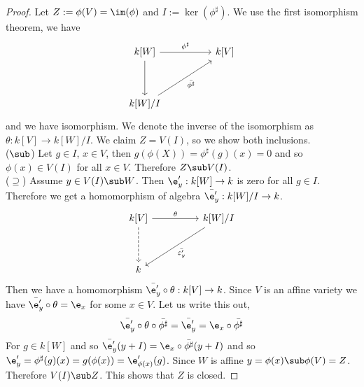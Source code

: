 \begin{proof}
  Let $Z := \phi(V) = \im (\phi)$ and $I := \ker(\phi^\sharp)$. We use the first isomorphism theorem, we have
  \[\begin{tikzcd}
	{k[W]} && {k[V]} \\
	\\
	{k[W]/I}
	\arrow["{\phi^\sharp}", from=1-1, to=1-3]
	\arrow["{\bar{\phi^\sharp}}"', from=3-1, to=1-3]
	\arrow[from=1-1, to=3-1]
\end{tikzcd}\]
and we have isomorphism. We denote the inverse of the isomorphism as $\theta : k[V] \to k[W]/I$. We claim $Z = V(I)$, so we show both inclusions.\\
($\sub$) Let $g \in I$, $x \in V$, then $g(\phi(X)) = \phi^\sharp (g)(x) = 0$ and so $\phi(x) \in V(I)$ for all $x \in V$. Therefore $Z \sub V(I)$.\\
($\supseteq$) Assume $y \in V(I) \sub W$. Then $\e'_y : k[W] \to k$ is zero for all $g \in I$. Therefore we get a homomorphism of algebra $\bar{\e'_y} : k[W]/I \to k$.
\[\begin{tikzcd}
	{k[V]} && {k[W]/I} \\
	\\
	k
	\arrow["\theta", from=1-1, to=1-3]
	\arrow["{\bar{\varepsilon'_y}}", from=1-3, to=3-1]
	\arrow[dashed, from=1-1, to=3-1]
\end{tikzcd}\]
Then we have a homomorphism $\bar{\e'_y} \circ \theta : k[V] \to k$. Since $V$ is an affine variety we have $\bar{\e'_y} \circ \theta = \e_x$ for some $x \in V$. Let us write this out,
$$ \bar{\e'_y} \circ \theta \circ \bar{\phi^\sharp} = \bar{\e'_{y}} = \e_x \circ \bar{\phi^\sharp} $$
For $g \in k[W]$ and so $\bar{\e'_y} (y + I) = \e_x \circ \bar{\phi^\sharp}(y + I)$ and so $\e'_y = \phi^\sharp (g)(x) = g(\phi(x)) = \e'_{\phi(x)}(g)$. Since $W$ is affine $y = \phi(x) \sub \phi(V) = Z$. Therefore $V(I) \sub Z$. This shows that $Z$ is closed.
\end{proof}